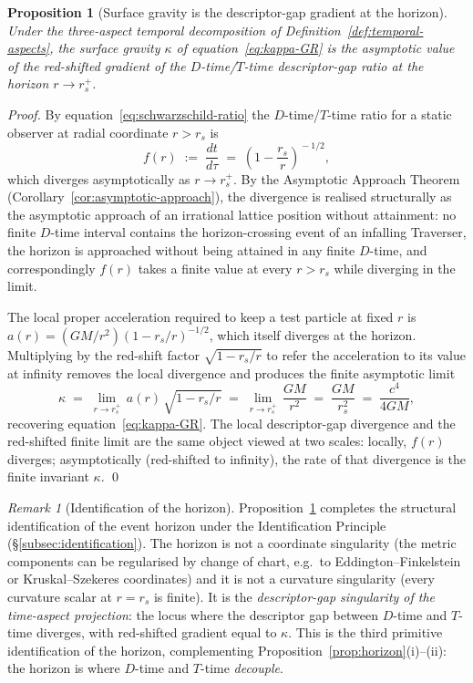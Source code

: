 \documentclass[11pt,a4paper]{article}
\newtheorem{proposition}[theorem]{Proposition}
\theoremstyle{definition}
\theoremstyle{remark}
\newtheorem{remark}[theorem]{Remark}
\begin{document}
\begin{proposition}[Surface gravity is the descriptor-gap gradient at the horizon]\label{prop:kappa-gradient}
Under the three-aspect temporal decomposition of Definition~\ref{def:temporal-aspects}, the surface gravity $\kappa$ of equation~\eqref{eq:kappa-GR} is the asymptotic value of the red-shifted gradient of the $D$-time/$T$-time descriptor-gap ratio at the horizon $r \to r_{s}^{+}$.
\end{proposition}

\begin{proof}
By equation~\eqref{eq:schwarzschild-ratio} the $D$-time/$T$-time ratio for a static observer at radial coordinate $r > r_{s}$ is
\[
f(r) \;:=\; \frac{dt}{d\tau} \;=\; \left(1 - \frac{r_{s}}{r}\right)^{\!-1/2},
\]
which diverges asymptotically as $r \to r_{s}^{+}$. By the Asymptotic Approach Theorem (Corollary~\ref{cor:asymptotic-approach}), the divergence is realised structurally as the asymptotic approach of an irrational lattice position without attainment: no finite $D$-time interval contains the horizon-crossing event of an infalling Traverser, the horizon is approached without being attained in any finite $D$-time, and correspondingly $f(r)$ takes a finite value at every $r > r_{s}$ while diverging in the limit.

The local proper acceleration required to keep a test particle at fixed $r$ is $a(r) = (GM/r^{2})(1 - r_{s}/r)^{-1/2}$, which itself diverges at the horizon. Multiplying by the red-shift factor $\sqrt{1 - r_{s}/r}$ to refer the acceleration to its value at infinity removes the local divergence and produces the finite asymptotic limit
\[
\kappa \;=\; \lim_{r \to r_{s}^{+}}\, a(r)\,\sqrt{1 - r_{s}/r}
       \;=\; \lim_{r \to r_{s}^{+}}\, \frac{GM}{r^{2}}
       \;=\; \frac{GM}{r_{s}^{2}}
       \;=\; \frac{c^{4}}{4GM},
\]
recovering equation~\eqref{eq:kappa-GR}. The local descriptor-gap divergence and the red-shifted finite limit are the same object viewed at two scales: locally, $f(r)$ diverges; asymptotically (red-shifted to infinity), the rate of that divergence is the finite invariant $\kappa$. \qed
\end{proof}

\begin{remark}[Identification of the horizon]\label{rem:horizon-identification}
Proposition~\ref{prop:kappa-gradient} completes the structural identification of the event horizon under the Identification Principle (\S\ref{subsec:identification}). The horizon is not a coordinate singularity (the metric components can be regularised by change of chart, e.g.\ to Eddington--Finkelstein or Kruskal--Szekeres coordinates) and it is not a curvature singularity (every curvature scalar at $r = r_{s}$ is finite). It is the \emph{descriptor-gap singularity of the time-aspect projection}: the locus where the descriptor gap between $D$-time and $T$-time diverges, with red-shifted gradient equal to $\kappa$. This is the third primitive identification of the horizon, complementing Proposition~\ref{prop:horizon}(i)--(ii): the horizon is where $D$-time and $T$-time \emph{decouple}.
\end{remark}
\end{document}
